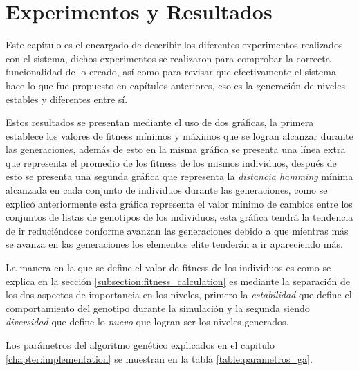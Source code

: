 \chapter{Experimentos y Resultados}
\label{chapter:experiments-and-results}

Este capítulo es el encargado de describir los diferentes experimentos
realizados con el sistema, dichos experimentos se realizaron para comprobar la
correcta funcionalidad de lo creado, así como para revisar que efectivamente el
sistema hace lo que fue propuesto en capítulos anteriores, eso es la generación
de niveles estables y diferentes entre sí.

Estos resultados se presentan mediante el uso de dos
gráficas, la primera establece los valores de fitness mínimos y máximos que se
logran alcanzar durante las generaciones, además de esto en la misma gráfica se
presenta una línea extra que representa el promedio de los fitness de los mismos
individuos, después de esto se presenta una segunda gráfica que representa la
\textit{distancia hamming} mínima alcanzada en cada conjunto de individuos
durante las generaciones, como se explicó anteriormente esta gráfica representa
el valor mínimo de cambios entre los conjuntos de listas de genotipos de los
individuos, esta gráfica tendrá la tendencia de ir reduciéndose conforme avanzan
las generaciones debido a que mientras más se avanza en las generaciones los
elementos elite tenderán a ir apareciendo más.

La manera en la que se define el valor de fitness de los individuos es como se
explica en la sección \ref{subsection:fitness_calculation} es mediante la
separación de los dos aspectos de importancia en los niveles, primero la
\textit{estabilidad} que define el comportamiento del genotipo durante la
simulación y la segunda siendo \textit{diversidad} que define lo \textit{nuevo}
que logran ser los niveles generados.

Los parámetros del algoritmo genético explicados en el capitulo
\ref{chapter:implementation} se muestran en la tabla \ref{table:parametros_ga}.


